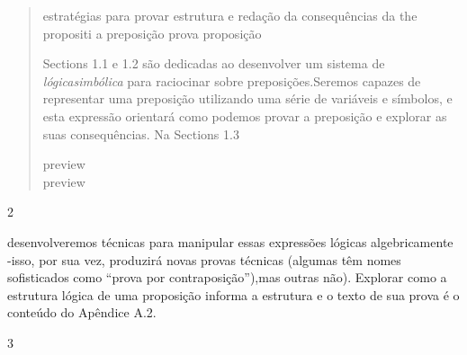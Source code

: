 \documentclass[
]{article}
\begin{document}
\begin{quote}
estratégias para provar estrutura e redação da consequências da the
propositi a preposição prova proposição

Sections 1.1 e 1.2 são dedicadas ao desenvolver um sistema de
\emph{lógicasimbólica} para raciocinar sobre preposições.Seremos capazes
de representar uma preposição utilizando uma série de variáveis e
símbolos, e esta expressão orientará como podemos provar a preposição e
explorar as suas consequências. Na Sections 1.3

preview\\
preview
\end{quote}

2

desenvolveremos técnicas para manipular essas expressões lógicas
algebricamente -isso, por sua vez, produzirá novas provas técnicas
(algumas têm nomes sofisticados como ``prova por contraposição''),mas
outras não). Explorar como a estrutura lógica de uma proposição informa
a estrutura e o texto de sua prova é o conteúdo do Apêndice A.2.

3
\end{document}
